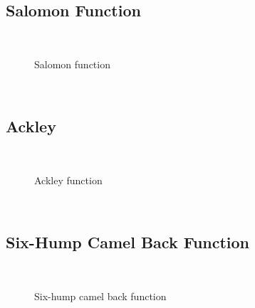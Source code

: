 \subsection{Salomon Function}
~
\begin{figure}[ht]
	\centering
	\setlength \fboxsep{0pt}
	\setlength \fboxrule{0.5pt}
	\caption{Salomon function}
	\label{fig:SalomonGraph}
\end{figure}
~
\subsection{Ackley}
~
\begin{figure}[ht]
	\centering
	\setlength \fboxsep{0pt}
	\setlength \fboxrule{0.5pt}
	\caption{Ackley function}
	\label{fig:AckleyGraph}
\end{figure}
~
\subsection{Six-Hump Camel Back Function}
~
\begin{figure}[ht]
	\centering
	\setlength \fboxsep{0pt}
	\setlength \fboxrule{0.5pt}
	\caption{Six-hump camel back function}
	\label{fig:CamelGraph}
\end{figure}
~
